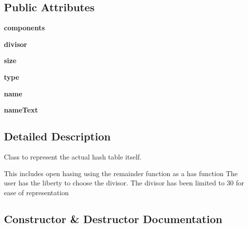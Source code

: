 \subsection*{Public Attributes}
\begin{DoxyCompactItemize}
\item 
\mbox{\label{class_hash_table_1_1_hash_table_ad5fb3032994116073ad71ba60c86acb5}} 
{\bfseries components}
\item 
\mbox{\label{class_hash_table_1_1_hash_table_a0adcbe4989d7c2285cd0fe6697fd8c46}} 
{\bfseries divisor}
\item 
\mbox{\label{class_hash_table_1_1_hash_table_aa82e53189cbd1b67c0a5b48e701ea487}} 
{\bfseries size}
\item 
\mbox{\label{class_hash_table_1_1_hash_table_a5cfd51a9f298bea34df8df10de3683e6}} 
{\bfseries type}
\item 
\mbox{\label{class_hash_table_1_1_hash_table_a4bee7a958ad508dd6206721d53325ed3}} 
{\bfseries name}
\item 
\mbox{\label{class_hash_table_1_1_hash_table_a57399e529868b9182c8dc128a877ccb2}} 
{\bfseries name\+Text}
\end{DoxyCompactItemize}


\subsection{Detailed Description}
Class to represent the actual hash table itself. 

This includes open hasing using the remainder function as a has function The user has the liberty to choose the divisor. The divisor has been limited to 30 for ease of representation 

\subsection{Constructor \& Destructor Documentation}
\mbox{\label{class_hash_table_1_1_hash_table_a775b63cd65429a5c9cfa386c570ff211}} 
